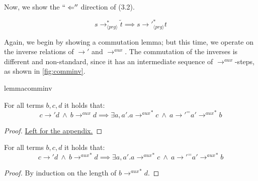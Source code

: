 Now, we show the $`` \Leftarrow ''$ direction of (3.2).

\begin{lemma}
\label{lem:prop2rl}
\[
s \longrightarrow^*_{\langle prg \rangle} \widetilde{t} \implies s {\longrightarrow'}_{\langle prg \rangle}^* t
\]
\end{lemma}

Again, we begin by showing a commutation lemma; but this time, we operate on the inverse relations of $\longrightarrow'$ and $\longrightarrow^{aux}$. The commutation of the inverses is different and non-standard, since it has an intermediate sequence of $\longrightarrow^{aux}$-steps, as shown in \autoref{fig:comminv}.

\begin{restatable}{lemma}{comminv}
\label{lem:comminv}

For all terms $b,c,d$ it holds that:
\[
c {\longrightarrow'} d ~ \land ~ b \longrightarrow^{aux} d \implies \exists a, a' . a {\longrightarrow^{aux}}^* c ~ \land ~ a {\longrightarrow'}^= a' {\longrightarrow^{aux}}^*  b
\]

\end{restatable}
\begin{proof}
\hyperref[prf:comminv]{Left for the appendix.}
\end{proof}

\begin{corollary}
\label{cor:comminvcor}

For all terms $b,c,d$ it holds that:
\[
c \longrightarrow' d ~ \land ~ b {\longrightarrow^{aux}}^* d \implies \exists a, a' . a {\longrightarrow^{aux}}^* c ~ \land ~ a {\longrightarrow'}^= a' {\longrightarrow^{aux}}^* b
\]

\begin{proof}

By induction on the length of $b {\longrightarrow^{aux}}^* d$.

\end{proof}
\end{corollary}

